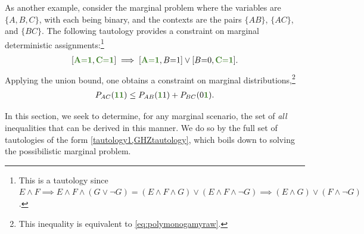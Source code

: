 {As another example, consider the marginal problem where the variables are $\{ A,B,C\}$, with each being binary, and the contexts are the pairs $\{AB\}$, $\{AC\}$, and $\{BC\}$.  
The following tautology provides a constraint on marginal deterministic assignments:\footnote{This is a tautology since $E \land F  \implies  E \land F \land (G \lor \lnot G) = (E \land F \land G) \lor (E\land F \land \lnot G) \implies (E \land G) \lor (F \land \lnot G)$.}
\begin{align}\label{GHZtautology}
 \bracks{\mgreen{A \eql 1}, \mgreen{C \eql 1}} \implies \bracks{\mgreen{A \eql 1}, B \eql 1} \lor \bracks{B \eql 0, \mgreen{C \eql 1}}.
\end{align}
Applying the union bound, one obtains a constraint on marginal distributions,\footnote{This inequality is equivalent to \cref{eq:polymonogamyraw}.}
\begin{align}\label{eq:trivmarginalconstraint}
	P_{AC}(\mgreen{1 1}) \leq P_{AB}(\mgreen{1} 1) + P_{BC}(0 \mgreen{1}).
\end{align}

In this section, we seek to determine, for any marginal scenario, the set of \emph{all} inequalities that can be derived in this manner.  We do so by  the full set of tautologies of the form \cref{tautology1,GHZtautology}, which boils down to solving the possibilistic marginal problem.

}
